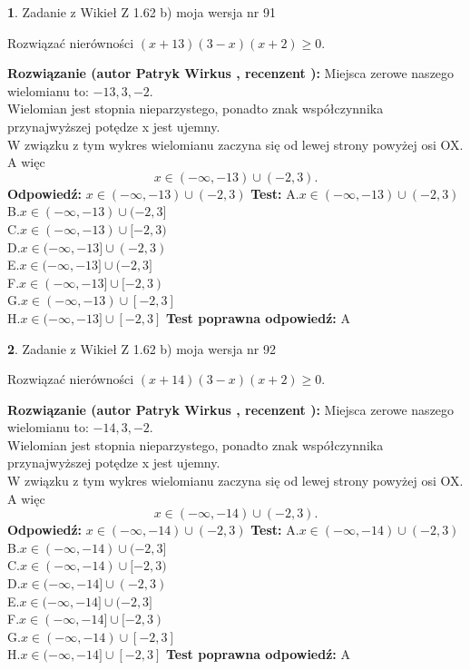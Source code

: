 \documentclass[12pt, a4paper]{article}
\theoremstyle{definition} %
\newtheorem{zad}{}
\newcommand{\zadStart}[1]{\begin{zad}#1\newline}
\newcommand{\zadStop}{\end{zad}}
\newcommand{\rozwStart}[2]{\noindent \textbf{Rozwiązanie (autor #1 , recenzent #2): }\newline}
\newcommand{\rozwStop}{\newline}
\newcommand{\odpStart}{\noindent \textbf{Odpowiedź:}\newline}
\newcommand{\odpStop}{\newline}
\newcommand{\testStart}{\noindent \textbf{Test:}\newline}
\newcommand{\testStop}{\newline}
\newcommand{\kluczStart}{\noindent \textbf{Test poprawna odpowiedź:}\newline}
\newcommand{\kluczStop}{\newline}
\begin{document}
\zadStart{Zadanie z Wikieł Z 1.62 b) moja wersja nr 91}

Rozwiązać nierówności $(x+13)(3-x)(x+2)\ge0$.
\zadStop
\rozwStart{Patryk Wirkus}{}
Miejsca zerowe naszego wielomianu to: $-13, 3, -2$.\\
Wielomian jest stopnia nieparzystego, ponadto znak współczynnika przy\linebreak najwyższej potędze x jest ujemny.\\ W związku z tym wykres wielomianu zaczyna się od lewej strony powyżej osi OX. A więc $$x \in (-\infty,-13) \cup (-2,3).$$
\rozwStop
\odpStart
$x \in (-\infty,-13) \cup (-2,3)$
\odpStop
\testStart
A.$x \in (-\infty,-13) \cup (-2,3)$\\
B.$x \in (-\infty,-13) \cup (-2,3]$\\
C.$x \in (-\infty,-13) \cup [-2,3)$\\
D.$x \in (-\infty,-13] \cup (-2,3)$\\
E.$x \in (-\infty,-13] \cup (-2,3]$\\
F.$x \in (-\infty,-13] \cup [-2,3)$\\
G.$x \in (-\infty,-13) \cup [-2,3]$\\
H.$x \in (-\infty,-13] \cup [-2,3]$
\testStop
\kluczStart
A
\kluczStop



\zadStart{Zadanie z Wikieł Z 1.62 b) moja wersja nr 92}

Rozwiązać nierówności $(x+14)(3-x)(x+2)\ge0$.
\zadStop
\rozwStart{Patryk Wirkus}{}
Miejsca zerowe naszego wielomianu to: $-14, 3, -2$.\\
Wielomian jest stopnia nieparzystego, ponadto znak współczynnika przy\linebreak najwyższej potędze x jest ujemny.\\ W związku z tym wykres wielomianu zaczyna się od lewej strony powyżej osi OX. A więc $$x \in (-\infty,-14) \cup (-2,3).$$
\rozwStop
\odpStart
$x \in (-\infty,-14) \cup (-2,3)$
\odpStop
\testStart
A.$x \in (-\infty,-14) \cup (-2,3)$\\
B.$x \in (-\infty,-14) \cup (-2,3]$\\
C.$x \in (-\infty,-14) \cup [-2,3)$\\
D.$x \in (-\infty,-14] \cup (-2,3)$\\
E.$x \in (-\infty,-14] \cup (-2,3]$\\
F.$x \in (-\infty,-14] \cup [-2,3)$\\
G.$x \in (-\infty,-14) \cup [-2,3]$\\
H.$x \in (-\infty,-14] \cup [-2,3]$
\testStop
\kluczStart
A
\kluczStop
\end{document}
